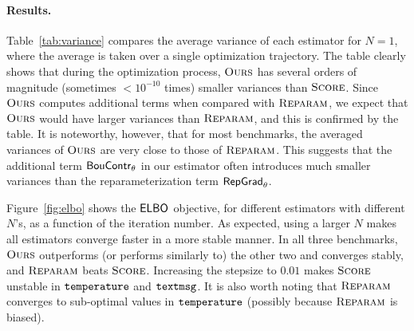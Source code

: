 \paragraph{Results.}
Table~\ref{tab:variance} compares the average variance of each estimator
for $N=1$, %
where the average is taken over a single optimization trajectory.
The table clearly shows that during the optimization process,
$\textsc{Ours}$ has several orders of magnitude (sometimes $<10^{-10}$ times) smaller variances
than $\textsc{Score}$.
Since $\textsc{Ours}$ computes additional terms when compared with $\textsc{Reparam}$,
we expect that $\textsc{Ours}$ would have larger variances than $\textsc{Reparam}$,
and this is confirmed by the table.
It is noteworthy, however, that for most benchmarks,
the averaged variances of $\textsc{Ours}$ are very close to those of $\textsc{Reparam}$. %
This suggests that the additional term $\mathsf{BouContr}_\theta$ in our estimator
often introduces much smaller variances than the reparameterization term $\mathsf{RepGrad}_\theta$.
%

Figure~\ref{fig:elbo} shows the ${\mathsf{ELBO}_{}}$ objective,
for different estimators with different $N$'s,
as a function of the iteration number. As expected, 
using a larger $N$ makes all estimators converge faster in a more stable manner. 
In all three benchmarks, $\textsc{Ours}$ outperforms (or performs similarly to) the other two and converges stably,
and $\textsc{Reparam}$ beats $\textsc{Score}$. Increasing the stepsize to $0.01$ makes
$\textsc{Score}$ unstable in $\mathtt{temperature}$ and $\mathtt{textmsg}$. It is also worth noting that
$\textsc{Reparam}$ converges to sub-optimal values in $\mathtt{temperature}$ (possibly because $\textsc{Reparam}$ is biased). 

